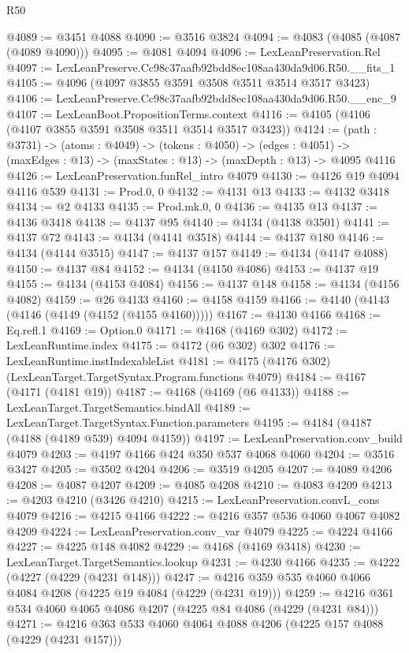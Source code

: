 \begin{lexlean}{R50}
\begin{coremodule}
@4089 := @3451 @4088
@4090 := @3516 @3824
@4094 := @4083 (@4085 (@4087 (@4089 @4090)))
@4095 := @4081 @4094
@4096 := LexLeanPreservation.Rel
@4097 := LexLeanPreserve.Cc98c37aafb92bdd8ec108aa430da9d06.R50.__fits_1
@4105 := @4096 (@4097 @3855 @3591 @3508 @3511 @3514 @3517 @3423)
@4106 := LexLeanPreserve.Cc98c37aafb92bdd8ec108aa430da9d06.R50.__enc_9
@4107 := LexLeanBoot.PropositionTerms.context
@4116 := @4105 (@4106 (@4107 @3855 @3591 @3508 @3511 @3514 @3517 @3423))
@4124 := (path : @3731) ->
  (atoms : @4049) ->
  (tokens : @4050) ->
  (edges : @4051) -> (maxEdges : @13) -> (maxStates : @13) -> (maxDepth : @13) -> @4095 @4116
@4126 := LexLeanPreservation.funRel_intro @4079
@4130 := @4126 @19 @4094 @4116 @539
@4131 := Prod.{0, 0}
@4132 := @4131 @13
@4133 := @4132 @3418
@4134 := @2 @4133
@4135 := Prod.mk.{0, 0}
@4136 := @4135 @13
@4137 := @4136 @3418
@4138 := @4137 @95
@4140 := @4134 (@4138 @3501)
@4141 := @4137 @72
@4143 := @4134 (@4141 @3518)
@4144 := @4137 @180
@4146 := @4134 (@4144 @3515)
@4147 := @4137 @157
@4149 := @4134 (@4147 @4088)
@4150 := @4137 @84
@4152 := @4134 (@4150 @4086)
@4153 := @4137 @19
@4155 := @4134 (@4153 @4084)
@4156 := @4137 @148
@4158 := @4134 (@4156 @4082)
@4159 := @26 @4133
@4160 := @4158 @4159
@4166 := @4140 (@4143 (@4146 (@4149 (@4152 (@4155 @4160)))))
@4167 := @4130 @4166
@4168 := Eq.refl.{1}
@4169 := Option.{0}
@4171 := @4168 (@4169 @302)
@4172 := LexLeanRuntime.index
@4175 := @4172 (@6 @302) @302
@4176 := LexLeanRuntime.instIndexableList
@4181 := @4175 (@4176 @302) (LexLeanTarget.TargetSyntax.Program.functions @4079)
@4184 := @4167 (@4171 (@4181 @19))
@4187 := @4168 (@4169 (@6 @4133))
@4188 := LexLeanTarget.TargetSemantics.bindAll
@4189 := LexLeanTarget.TargetSyntax.Function.parameters
@4195 := @4184 (@4187 (@4188 (@4189 @539) @4094 @4159))
@4197 := LexLeanPreservation.conv_build @4079
@4203 := @4197 @4166 @424 @350 @537 @4068 @4060
@4204 := @3516 @3427
@4205 := @3502 @4204
@4206 := @3519 @4205
@4207 := @4089 @4206
@4208 := @4087 @4207
@4209 := @4085 @4208
@4210 := @4083 @4209
@4213 := @4203 @4210 (@3426 @4210)
@4215 := LexLeanPreservation.convL_cons @4079
@4216 := @4215 @4166
@4222 := @4216 @357 @536 @4060 @4067 @4082 @4209
@4224 := LexLeanPreservation.conv_var @4079
@4225 := @4224 @4166
@4227 := @4225 @148 @4082
@4229 := @4168 (@4169 @3418)
@4230 := LexLeanTarget.TargetSemantics.lookup
@4231 := @4230 @4166
@4235 := @4222 (@4227 (@4229 (@4231 @148)))
@4247 := @4216 @359 @535 @4060 @4066 @4084 @4208 (@4225 @19 @4084 (@4229 (@4231 @19)))
@4259 := @4216 @361 @534 @4060 @4065 @4086 @4207 (@4225 @84 @4086 (@4229 (@4231 @84)))
@4271 := @4216 @363 @533 @4060 @4064 @4088 @4206 (@4225 @157 @4088 (@4229 (@4231 @157)))

\end{coremodule}
\end{lexlean}
